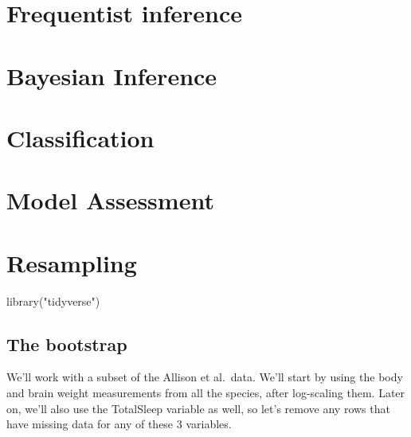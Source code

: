 \documentclass[
]{book}
\newenvironment{Shaded}{\begin{snugshade}}{\end{snugshade}}
\newcommand{\FunctionTok}[1]{\textcolor[rgb]{0.00,0.00,0.00}{#1}}
\newcommand{\NormalTok}[1]{#1}
\newcommand{\StringTok}[1]{\textcolor[rgb]{0.31,0.60,0.02}{#1}}
\begin{document}
\hypertarget{frequentist-inference}{%
\chapter{Frequentist inference}\label{frequentist-inference}}

\hypertarget{bayesian-inference}{%
\chapter{Bayesian Inference}\label{bayesian-inference}}

\hypertarget{classification}{%
\chapter{Classification}\label{classification}}

\hypertarget{model-assessment}{%
\chapter{Model Assessment}\label{model-assessment}}

\hypertarget{resampling}{%
\chapter{Resampling}\label{resampling}}

\begin{Shaded}
\begin{Highlighting}[]
\FunctionTok{library}\NormalTok{(}\StringTok{"tidyverse"}\NormalTok{)}
\end{Highlighting}
\end{Shaded}

\hypertarget{the-bootstrap}{%
\section{The bootstrap}\label{the-bootstrap}}

We'll work with a subset of the Allison et al.~data. We'll start by using the body and brain weight measurements from all the species, after log-scaling them. Later on, we'll also use the TotalSleep variable as well, so let's remove any rows that have missing data for any of these 3 variables.
\end{document}
